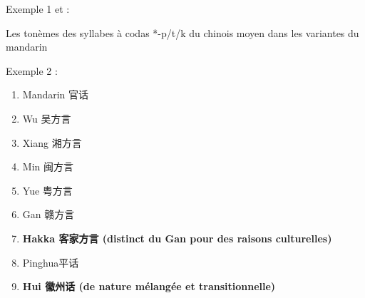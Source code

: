 \documentclass[11pt]{beamer}
\begin{document}
\begin{frame}{Exemple 1}
\textcite[A2]{li1987atlas} et \textcite[5]{Shen1994Taiyuan} : 

%

Les tonèmes des syllabes à codas *-p/t/k du chinois moyen dans les variantes du mandarin
\end{frame}

\begin{frame}{Exemple 2}
\textcite{li2012pinghua} : 
\begin{enumerate}
\item{Mandarin 官话}
\item{Wu 吴方言}
\item{Xiang 湘方言}
\item{Min 闽方言}
\item{Yue 粤方言}
\item{Gan 赣方言}
\item{\textbf{Hakka 客家方言 (distinct du Gan pour des raisons culturelles)}}
\item{Pinghua平话}
\item{\textbf{Hui 徽州话 (de nature mélangée et transitionnelle)}}
\end{enumerate}
\end{frame}
\end{document}
